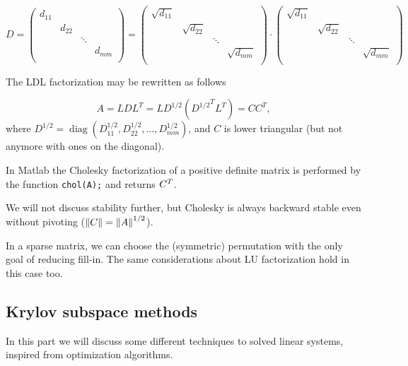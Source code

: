 \documentclass[ComputationalMathematics.tex]{subfiles}
\begin{document}
$D = \begin{pmatrix}
  d_{11}&&\\
  &d_{22} &\\
  && \ddots\\
  &&& d_{mm}\\
\end{pmatrix} = \begin{pmatrix}
  \sqrt{d_{11}}&&\\
  &\sqrt{d_{22}} &\\
  && \ddots\\
  &&& \sqrt{d_{mm}}\\
\end{pmatrix} \cdot
\begin{pmatrix}
  \sqrt{d_{11}}&&\\
  &\sqrt{d_{22}} &\\
  && \ddots\\
  &&& \sqrt{d_{mm}}\\
\end{pmatrix}
$

The LDL factorization may be rewritten as follows

\[
A = LDL^T = LD^{1/2} ({D^{1/2}}^T L^T) = C C^T,
\]
where $D^{1/2} = \operatorname{diag}(D_{11}^{1/2}, D_{22}^{1/2},\dots,D_{mm}^{1/2})$, and $C$ is lower triangular (but not anymore with ones on the diagonal).

In Matlab the Cholesky factorization of a positive definite matrix is performed by the function \texttt{chol(A);} and returns ${C}^{T}$.

\begin{obs}
We will not discuss stability further, but Cholesky is always backward stable even without pivoting ($\left\lVert C\right\rVert=\left\lVert A\right\rVert^{1/2}$).
\end{obs}


\begin{obs}
In a sparse matrix, we can choose the (symmetric) permutation with the only goal of reducing fill-in. The same considerations about LU factorization hold in this case too.
\end{obs}

\subsection{Krylov subspace methods}

In this part we will discuss some different techniques to solved linear systems, inspired from optimization algorithms.
\end{document}
